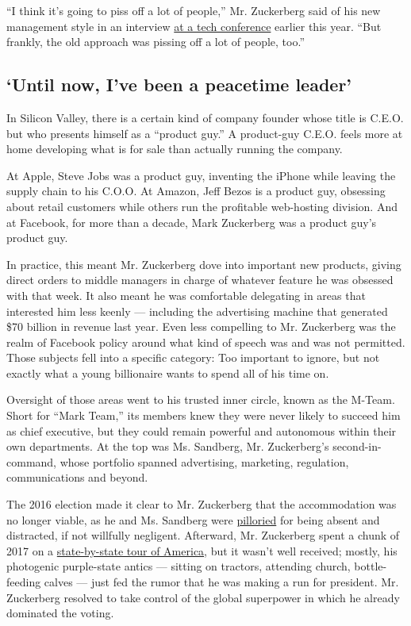 ``I think it's going to piss off a lot of people,'' Mr. Zuckerberg said
of his new management style in an interview
\href{https://www.cnbc.com/2020/01/31/mark-zuckerberg-silicon-slopes-speech-honesty-will-piss-off-people.html}{at
a tech conference} earlier this year. ``But frankly, the old approach
was pissing off a lot of people, too.''

\hypertarget{until-now-ive-been-a-peacetime-leader}{%
\subsection{`Until now, I've been a peacetime
leader'}\label{until-now-ive-been-a-peacetime-leader}}

In Silicon Valley, there is a certain kind of company founder whose
title is C.E.O. but who presents himself as a ``product guy.'' A
product-guy C.E.O. feels more at home developing what is for sale than
actually running the company.

At Apple, Steve Jobs was a product guy, inventing the iPhone while
leaving the supply chain to his C.O.O. At Amazon, Jeff Bezos is a
product guy, obsessing about retail customers while others run the
profitable web-hosting division. And at Facebook, for more than a
decade, Mark Zuckerberg was a product guy's product guy.

In practice, this meant Mr. Zuckerberg dove into important new products,
giving direct orders to middle managers in charge of whatever feature he
was obsessed with that week. It also meant he was comfortable delegating
in areas that interested him less keenly --- including the advertising
machine that generated \$70 billion in revenue last year. Even less
compelling to Mr. Zuckerberg was the realm of Facebook policy around
what kind of speech was and was not permitted. Those subjects fell into
a specific category: Too important to ignore, but not exactly what a
young billionaire wants to spend all of his time on.

Oversight of those areas went to his trusted inner circle, known as the
M-Team. Short for ``Mark Team,'' its members knew they were never likely
to succeed him as chief executive, but they could remain powerful and
autonomous within their own departments. At the top was Ms. Sandberg,
Mr. Zuckerberg's second-in-command, whose portfolio spanned advertising,
marketing, regulation, communications and beyond.

The 2016 election made it clear to Mr. Zuckerberg that the accommodation
was no longer viable, as he and Ms. Sandberg were
\href{https://www.nytimes.com/2018/11/14/technology/facebook-data-russia-election-racism.html}{pilloried}
for being absent and distracted, if not willfully negligent. Afterward,
Mr. Zuckerberg spent a chunk of 2017 on a
\href{https://www.nytimes.com/2017/05/25/technology/zuckerberg-harvard-commencement-road-trip.html}{state-by-state
tour of America}, but it wasn't well received; mostly, his photogenic
purple-state antics --- sitting on tractors, attending church,
bottle-feeding calves --- just fed the rumor that he was making a run
for president. Mr. Zuckerberg resolved to take control of the global
superpower in which he already dominated the voting.

